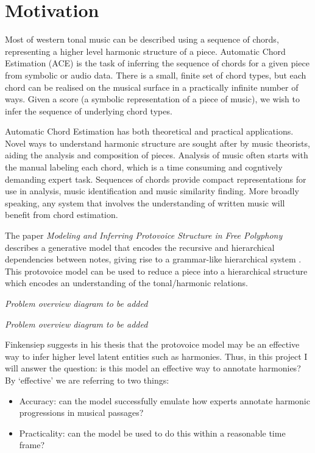 \documentclass[12pt,a4paper,twoside,openright]{report}
\theoremstyle{definition}
\begin{document}
\section{Motivation}
Most of western tonal music can be described using a sequence of chords, representing a higher level harmonic structure of a piece. Automatic Chord Estimation (ACE) is the task of inferring the sequence of chords for a given piece from symbolic or audio data. There is a small, finite set of chord types, but each chord can be realised on the musical surface in a practically infinite number of ways. Given a score (a symbolic representation of a piece of music), we wish to infer the sequence of underlying chord types. 
\par
Automatic Chord Estimation has both theoretical and practical applications. Novel ways to understand harmonic structure are sought after by music theorists, aiding the analysis and composition of pieces. Analysis of music often starts with the manual labeling each chord, which is a time consuming and cogntively demanding expert task. Sequences of chords provide compact representations for use in analysis, music identification and music similarity finding. More broadly speaking, any system that involves the understanding of written music will benefit from chord estimation. 
\par
The paper \textit{Modeling and Inferring Protovoice Structure in Free Polyphony} describes a generative model that encodes the recursive and hierarchical dependencies between notes, giving rise to a grammar-like hierarchical system \cite{finkensiepModelingInferringProtovoice2021}. This protovoice model can be used to reduce a piece into a hierarchical structure which encodes an understanding of the tonal/harmonic relations.
\par
\textit{Problem overview diagram to be added}
\par
\textit{Problem overview diagram to be added}
\par
Finkensiep suggests in his thesis that the protovoice model may be an effective way to infer higher level latent entities such as harmonies. Thus, in this project I will answer the question: is this model an effective way to annotate harmonies? By ‘effective’ we are referring to two things:
\begin{itemize}
  \item Accuracy: can the model successfully emulate how experts annotate harmonic progressions in musical passages? 
  \item Practicality: can the model be used to do this within a reasonable time frame?
\end{itemize}
\end{document}
